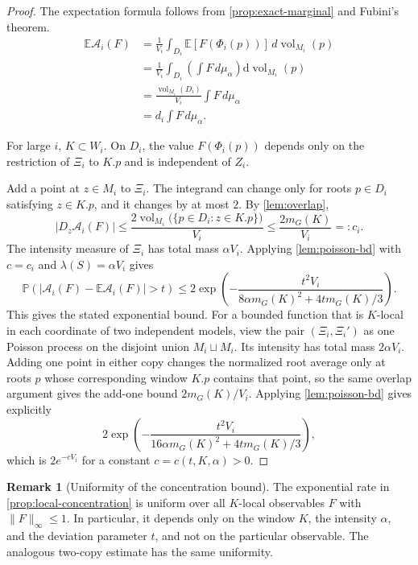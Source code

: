 \documentclass[12pt]{amsart}
\theoremstyle{definition}
\newtheorem{remark}[remark]{Remark}
\newcommand{\Haar}{m_G}
\newcommand{\vol}{\operatorname{vol}}
\newcommand{\1}{\mathbf 1}
\newcommand{\dd}{\,d}
\newcommand{\abs}[1]{\left\lvert#1\right\rvert}
\begin{document}
\begin{proof}
The expectation formula follows from \cref{prop:exact-marginal} and Fubini's theorem.
\begin{align*}
	\mathbb E\mathcal A_i(F) &= \frac{1}{V_i} \int_{D_i} \mathbb E[F(\Phi_i(p))] \dd\vol_{M_i}(p) \\
	&= \frac{1}{V_i} \int_{D_i} \left( \int F \dd\mu_\alpha \right) \mathrm{d}\vol_{M_i}(p) \\
	&= \frac{\vol_{M_i}(D_i)}{V_i} \int F \dd\mu_\alpha \\
	&= d_i \int F \dd\mu_\alpha.
\end{align*}

For large $i$, $K\subset W_i$. On $D_i$, the value $F(\Phi_i(p))$ depends only on the restriction of $\Xi_i$ to $K.p$ and is independent of $Z_i$.

Add a point at $z\in M_i$ to $\Xi_i$. The integrand can change only for roots $p\in D_i$ satisfying $z\in K.p$, and it changes by at most $2$. By \cref{lem:overlap},
\[
 \abs{D_z\mathcal A_i(F)}\leq\frac{2\vol_{M_i}\bigl(\{p\in D_i:z\in K.p\}\bigr)}{V_i}\leq\frac{2\Haar(K)}{V_i}=:c_i.
\]
The intensity measure of $\Xi_i$ has total mass $\alpha V_i$. Applying \cref{lem:poisson-bd} with $c=c_i$ and $\lambda(S)=\alpha V_i$ gives
\[
 \mathbb P\left(\abs{\mathcal A_i(F)-\mathbb E\mathcal A_i(F)}>t\right)
 \leq2\exp\left(
 -\frac{t^2V_i}{8\alpha\Haar(K)^2+4t\Haar(K)/3}
 \right).
\]
This gives the stated exponential bound. For a bounded function that is $K$-local in each coordinate of two independent models, view the pair $(\Xi_i,\Xi_i')$ as one Poisson process on the disjoint union $M_i\sqcup M_i$. Its intensity has total mass $2\alpha V_i$. Adding one point in either copy changes the normalized root average only at roots $p$ whose corresponding window $K.p$ contains that point, so the same overlap argument gives the add-one bound $2\Haar(K)/V_i$. Applying \cref{lem:poisson-bd} gives explicitly
\[
 2\exp\left(
 -\frac{t^2V_i}{16\alpha\Haar(K)^2+4t\Haar(K)/3}
 \right),
\]
which is $2e^{-cV_i}$ for a constant $c=c(t,K,\alpha)>0$.
\end{proof}

\begin{remark}[Uniformity of the concentration bound]
The exponential rate in \cref{prop:local-concentration} is uniform over all
$K$-local observables $F$ with $\|F\|_\infty\leq1$. In particular, it depends
only on the window $K$, the intensity $\alpha$, and the deviation parameter
$t$, and not on the particular observable. The analogous two-copy estimate
has the same uniformity.
\end{remark}
\end{document}

